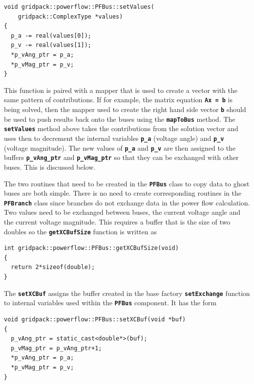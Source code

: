 \documentclass[12pt]{report} %
\begin{document}
{
\color{red}
\begin{Verbatim}[fontseries=b]
void gridpack::powerflow::PFBus::setValues(
    gridpack::ComplexType *values)
{
  p_a -= real(values[0]);
  p_v -= real(values[1]);
  *p_vAng_ptr = p_a;
  *p_vMag_ptr = p_v;
}
\end{Verbatim}
}

This function is paired with a mapper that is used to create a vector with the same pattern of contributions. If for example, the matrix equation \texttt{\textbf{Ax = b}} is being solved, then the mapper used to create the right hand side vector \texttt{\textbf{b}} should be used to push results back onto the buses using the \texttt{\textbf{mapToBus}} method. The \texttt{\textbf{setValues}} method above takes the contributions from the solution vector and uses then to decrement the internal variables \texttt{\textbf{p\_a}} (voltage angle) and \texttt{\textbf{p\_v}} (voltage magnitude). The new values of \texttt{\textbf{p\_a}} and \texttt{\textbf{p\_v}} are then assigned to the buffers \texttt{\textbf{p\_vAng\_ptr}} and \texttt{\textbf{p\_vMag\_ptr}} so that they can be exchanged with other buses. This is discussed below.

The two routines that need to be created in the \texttt{\textbf{PFBus}} class to copy data to ghost buses are both simple. There is no need to create corresponding routines in the \texttt{\textbf{PFBranch}} class since branches do not exchange data in the power flow calculation. Two values need to be exchanged between buses, the current voltage angle and the current voltage magnitude. This requires a buffer that is the size of two doubles so the \texttt{\textbf{getXCBufSize}} function is written as

{
\color{red}
\begin{Verbatim}[fontseries=b]
int gridpack::powerflow::PFBus::getXCBufSize(void)
{
  return 2*sizeof(double);
}
\end{Verbatim}
}

The \texttt{\textbf{setXCBuf}} assigns the buffer created in the base factory \texttt{\textbf{setExchange}} function to internal variables used within the \texttt{\textbf{PFBus}} component. It has the form

{
\color{red}
\begin{Verbatim}[fontseries=b]
void gridpack::powerflow::PFBus::setXCBuf(void *buf)
{
  p_vAng_ptr = static_cast<double*>(buf);
  p_vMag_ptr = p_vAng_ptr+1;
  *p_vAng_ptr = p_a;
  *p_vMag_ptr = p_v;
}
\end{Verbatim}
}
\end{document}

